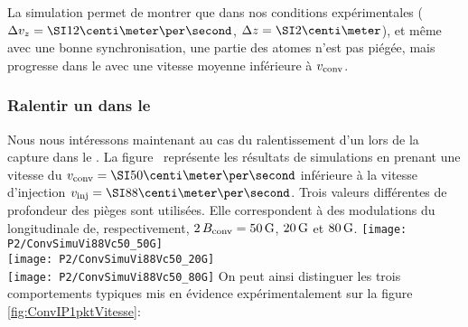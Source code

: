 La simulation permet de montrer que dans nos conditions expérimentales ($\deltavjet=\cmps{12}$, $\Dzini=\cm{2}$), et même avec une bonne synchronisation, une partie des atomes n'est pas piégée, mais progresse dans le \tp avec une vitesse moyenne inférieure à ${v_{\rm conv}}$. 

\casse

\subsubsection{Ralentir un \pat dans le \tpIP}
Nous nous intéressons maintenant au cas du ralentissement d'un \pat lors de la capture dans le \tp. 
La figure~ représente les résultats de simulations en prenant une vitesse du \conv $\vconv=\cmps{50}$ inférieure à la vitesse d'injection $\vinj=\cmps{88}$. Trois valeurs différentes de profondeur des pièges sont utilisées. Elle correspondent à des modulations du \chm longitudinale de, respectivement, $2\,{B_{\rm conv}} = \SI{50}{{\rm G}}$, $\SI{20}{{\rm G}}$ et $\SI{80}{{\rm G}}$.
%
\bfigs
\subfloat%
{\label{ConvSimuVi88Vc50_a}
\texttt{[image: P2/ConvSimuVi88Vc50\_50G]}
}\\
\RemonteUnPeuFig
\subfloat%
{\label{ConvSimuVi88Vc50_b}
\texttt{[image: P2/ConvSimuVi88Vc50\_20G]}
}\\
\RemonteUnPeuFig
\subfloat%
{\label{ConvSimuVi88Vc50_c}
\texttt{[image: P2/ConvSimuVi88Vc50\_80G]}
}
\label{fig:ConvSimuVi88Vc50}
\efig
%
On peut ainsi distinguer les trois comportements typiques mis en évidence expérimentalement sur la figure \vref{fig:ConvIP1pktVitesse}:
